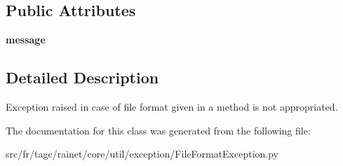 \subsection*{Public Attributes}
\begin{DoxyCompactItemize}
\item 
\hypertarget{classsrc_1_1fr_1_1tagc_1_1rainet_1_1core_1_1util_1_1exception_1_1FileFormatException_1_1FileFormatException_aa199dfd8c7e58f6832074ee235628f21}{{\bfseries message}}\label{classsrc_1_1fr_1_1tagc_1_1rainet_1_1core_1_1util_1_1exception_1_1FileFormatException_1_1FileFormatException_aa199dfd8c7e58f6832074ee235628f21}

\end{DoxyCompactItemize}


\subsection{Detailed Description}
Exception raised in case of file format given in a method is not appropriated. 

The documentation for this class was generated from the following file\-:\begin{DoxyCompactItemize}
\item 
src/fr/tagc/rainet/core/util/exception/File\-Format\-Exception.\-py\end{DoxyCompactItemize}
